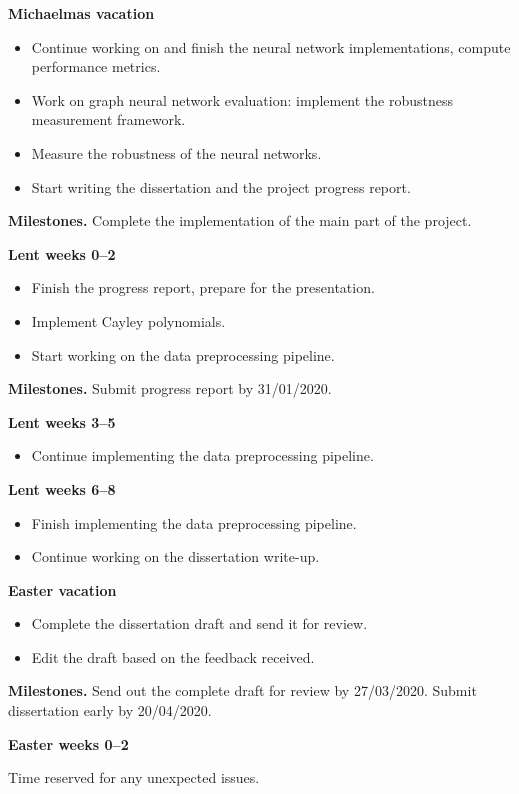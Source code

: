 \documentclass[12pt,a4paper,twoside]{article}
\begin{document}
\textbf{Michaelmas vacation}
\begin{itemize}
  \item Continue working on and finish the neural network implementations, compute performance metrics.
  \item Work on graph neural network evaluation: implement the robustness measurement framework.
  \item Measure the robustness of the neural networks.
  \item Start writing the dissertation and the project progress report.
\end{itemize}

\textbf{Milestones.} Complete the implementation of the main part of the project.

\textbf{Lent weeks 0–2}
\begin{itemize}
  \item Finish the progress report, prepare for the presentation.
  \item Implement Cayley polynomials.
  \item Start working on the data preprocessing pipeline.
\end{itemize}
 
\textbf{Milestones.} Submit progress report by 31/01/2020.

\textbf{Lent weeks 3–5}
\begin{itemize}
  \item Continue implementing the data preprocessing pipeline.
\end{itemize}


\textbf{Lent weeks 6–8}
\begin{itemize}
  \item Finish implementing the data preprocessing pipeline.
  \item Continue working on the dissertation write-up.
\end{itemize}

\textbf{Easter vacation}
\begin{itemize}
  \item Complete the dissertation draft and send it for review.
  \item Edit the draft based on the feedback received.
\end{itemize}

\textbf{Milestones.} Send out the complete draft for review by 27/03/2020. Submit dissertation early by 20/04/2020.

\textbf{Easter weeks 0–2}

 Time reserved for any unexpected issues.



\end{document}
